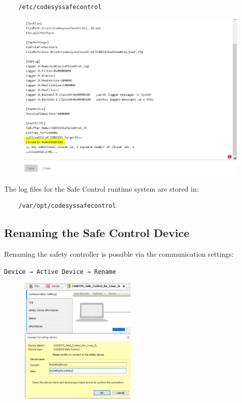 \documentclass[a4paper,12pt]{article}
\begin{document}
\begin{verbatim}
	/etc/codesyssafecontrol
\end{verbatim}

\begin{figure}[H]
	\centering
	\includegraphics[width=1\textwidth]{16.JPG}
\end{figure}

The log files for the Safe Control runtime system are stored in:

\begin{verbatim}
	/var/opt/codesyssafecontrol
\end{verbatim}

\subsection{Renaming the Safe Control Device}

Renaming the safety controller is possible via the communication settings:

\texttt{Device → Active Device → Rename}
\begin{figure}[H]
	\centering
	\includegraphics[width=0.5\textwidth]{17.JPG}
\end{figure}
\end{document}
